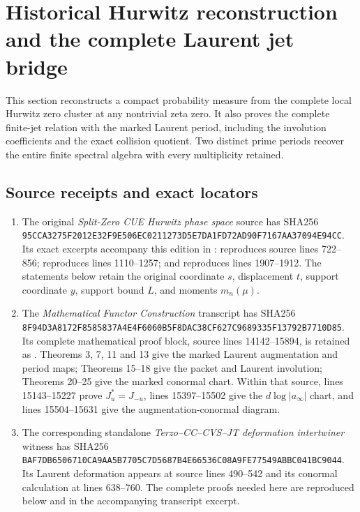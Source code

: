 \section{Historical Hurwitz reconstruction and the complete Laurent jet bridge}\label{historical-hurwitz-reconstruction-and-the-complete-laurent-jet-bridge}

This section reconstructs a compact probability measure from the complete local Hurwitz zero cluster at any nontrivial zeta zero. It also proves the complete finite-jet relation with the marked Laurent period, including the involution coefficients and the exact collision quotient. Two distinct prime periods recover the entire finite spectral algebra with every multiplicity retained.

\subsection{Source receipts and exact locators}\label{source-receipts-and-exact-locators}

\begin{enumerate}
\def\labelenumi{\arabic{enumi}.}
\tightlist
\item
  The original \emph{Split-Zero CUE Hurwitz phase space} source has SHA256 \nolinkurl{95CCA3275F2012E32F9E506EC0211273D5E7DA1FD72AD90F7167AA37094E94CC}. Its exact excerpts accompany this edition in :  reproduces source lines 722--856;  reproduces lines 1110--1257; and  reproduces lines 1907--1912. The statements below retain the original coordinate \(s\), displacement \(t\), support coordinate \(y\), support bound \(L\), and moments \(m_n(\mu)\).
\item
  The \emph{Mathematical Functor Construction} transcript has SHA256 \nolinkurl{8F94D3A8172F8585837A4E4F6060B5F8DAC38CF627C9689335F13792B7710D85}. Its complete mathematical proof block, source lines 14142--15894, is retained as . Theorems 3, 7, 11 and 13 give the marked Laurent augmentation and period maps; Theorems 15--18 give the packet and Laurent involution; Theorems 20--25 give the marked conormal chart. Within that source, lines 15143--15227 prove \(J_u^*=J_{-u}\), lines 15397--15502 give the \(d\log|a_\infty|\) chart, and lines 15504--15631 give the augmentation-conormal diagram.
\item
  The corresponding standalone \emph{Terzo--CC--CVS--JT deformation intertwiner} witness has SHA256 \nolinkurl{BAF7DB6506710CA9AA5B7705C7D5687B4E66536C08A9FE77549ABBC041BC9044}. Its Laurent deformation appears at source lines 490--542 and its conormal calculation at lines 638--760. The complete proofs needed here are reproduced below and in the accompanying transcript excerpt.
\end{enumerate}

